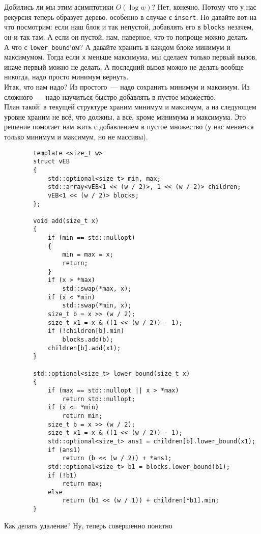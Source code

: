 \documentclass{article}
\begin{document}
    Добились ли мы этим асимптотики $O(\log w)$? Нет, конечно. Потому что у нас рекурсия теперь образует дерево. особенно в случае с \texttt{insert}. Но давайте вот на что посмотрим: если наш блок и так непустой, добавлять его в \texttt{blocks} незачем, он и так там. А если он пустой, нам, наверное, что-то попроще можно делать.\\
    А что с \texttt{lower_bound}'ом? А давайте хранить в каждом блоке минимум и максимумом. Тогда если \texttt{x} меньше максимума, мы сделаем только первый вызов, иначе первый можно не делать. А последний вызов можно не делать вообще никогда, надо просто минимум вернуть.\\
    Итак, что нам надо? Из простого~--- надо сохранить минимум и максимум. Из сложного~--- надо научиться быстро добавлять в пустое множество.\\
    План такой: в текущей структуре храним минимум и максимум, а на следующем уровне храним не всё, что должны, а всё, кроме минимума и максимума. Это решение помогает нам жить с добавлением в пустое множество (у нас меняется только минимум и максимум, но не массивы).
    \begin{verbatim}
        template <size_t w>
        struct vEB
        {
            std::optional<size_t> min, max;
            std::array<vEB<1 << (w / 2)>, 1 << (w / 2)> children;
            vEB<1 << (w / 2)> blocks;
        };

        void add(size_t x)
        {
            if (min == std::nullopt)
            {
                min = max = x;
                return;
            }
            if (x > *max)
                std::swap(*max, x);
            if (x < *min)
                std::swap(*min, x);
            size_t b = x >> (w / 2);
            size_t x1 = x & ((1 << (w / 2)) - 1);
            if (!children[b].min)
                blocks.add(b);
            children[b].add(x1);
        }

        std::optional<size_t> lower_bound(size_t x)
        {
            if (max == std::nullopt || x > *max)
                return std::nullopt;
            if (x <= *min)
                return min;
            size_t b = x >> (w / 2);
            size_t x1 = x & ((1 << (w / 2)) - 1);
            std::optional<size_t> ans1 = children[b].lower_bound(x1);
            if (ans1)
                return (b << (w / 2)) + *ans1;
            std::optional<size_t> b1 = blocks.lower_bound(b1);
            if (!b1)
                return max;
            else
                return (b1 << (w / 1)) + children[*b1].min;
        }
    \end{verbatim}
    Как делать удаление? Ну, теперь совершенно понятно
\end{document}
